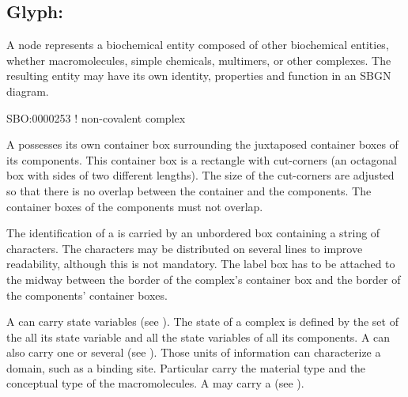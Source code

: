 

\subsection{Glyph: }\label{sec:complex}

A  node represents a biochemical entity composed of other biochemical entities, whether macromolecules, simple chemicals, multimers, or other complexes.  The resulting entity may have its own identity, properties and function in an SBGN diagram.

\begin{glyphDescription}

\glyphSboTerm SBO:0000253 ! non-covalent complex

\glyphContainer A  possesses its own container box surrounding the juxtaposed container boxes of its components.  This container box is a rectangle with cut-corners (an octagonal box with sides of two different lengths).  The size of the cut-corners are adjusted so that there is no overlap between the container and the components.  The container boxes of the components must not overlap.

\glyphLabel The identification of a  is carried by an unbordered box containing a string of characters.  The characters may be distributed on several lines to improve readability, although this is not mandatory.  The label box has to be attached to the midway between the border of the complex's container box and the border of the components' container boxes.

\glyphAux A  can carry state variables (see ).  The state of a complex is defined by the set of the all its state variable and all the state variables of all its components.  A  can also carry one or several  (see ).  Those units of information can characterize a domain, such as a binding site.  Particular  carry the material type and the conceptual type of the macromolecules.  A  may carry a  (see ).

\end{glyphDescription}


